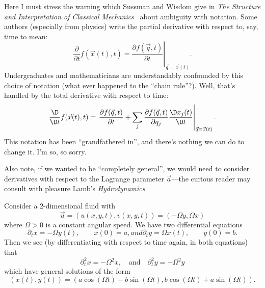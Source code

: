 \begin{node}
\begin{node}\label{fluids:describing-0007}%
Here I must stress the warning which Sussman and Wisdom give in
\textit{The Structure and Interpretation of Classical Mechanics}~\cite{sicm}
about ambiguity with notation. Some authors (especially from physics)
write the partial derivative with respect to, say, time to mean:
\begin{equation}
  \frac{\partial}{\partial t}f(\vec{x}(t), t)
  = \left.\frac{\partial f(\vec{q}, t)}{\partial t}\right|_{\vec{q}=\vec{x}(t)}.
\end{equation}
Undergraduates and mathematicians are understandably confounded by this
choice of notation (what ever happened to the ``chain rule''?). Well,
that's handled by the total derivative with respect to time:
\begin{equation}
\frac{\D}{\D t}f(\vec{x}(t), t)
= \left.\frac{\partial f(\vec{q}, t)}{\partial t}
  + \sum_{j}\frac{\partial f(\vec{q},t)}{\partial q_{j}}\frac{\D x_{j}(t)}{\D t}\right|_{\vec{q}=\vec{x}(t)}.
\end{equation}
This notation has been ``grandfathered in'', and there's nothing we can
do to change it. I'm so, so sorry.
\end{node} %
\begin{node}\label{fluids:describing-0008}%
Also note, if we wanted to be ``completely general'', we would need to
consider derivatives with respect to the Lagrange parameter
$\vec{a}$---the curious reader may consult with pleasure Lamb's \textit{Hydrodynamics}~\cite[\S\S13--14]{lamb1945hydrodynamics}
\end{node}
\end{node} %

\begin{example}
Consider a 2-dimensional fluid with
\begin{equation*}
\vec{u}=(u(x,y,t), v(x,y,t))=(-\Omega y,\Omega x)
\end{equation*}
where $\Omega>0$ is a constant angular speed. We have two differential
equations
\begin{subequations}
\begin{equation}
\partial_{t}x = -\Omega y(t),\qquad x(0)=a,
\end{equation}
and
\begin{equation}
\partial_{t}y = \Omega x(t),\qquad y(0)=b.
\end{equation}
\end{subequations}
Then we see (by differentiating with respect to time again, in both
equations) that 
\begin{equation*}
\partial_{t}^{2}x = -\Omega^{2}x,\quad\mbox{and}\quad\partial_{t}^{2}y=-\Omega^{2}y
\end{equation*}
which have general solutions of the form
\begin{equation}
(x(t),y(t)) = (a\cos(\Omega t)-b\sin(\Omega t), b\cos(\Omega t) + a\sin(\Omega t)).
\end{equation}
\end{example}

